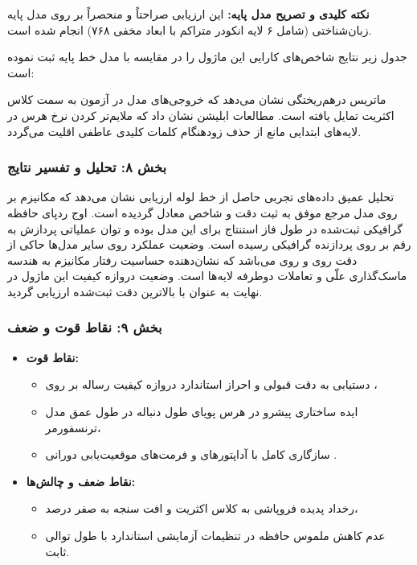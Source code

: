 \textbf{نکته کلیدی و تصریح مدل پایه:} این ارزیابی صراحتاً و منحصراً بر روی مدل پایه زبان‌شناختی  (شامل ۶ لایه انکودر متراکم با ابعاد مخفی ۷۶۸) انجام شده است.

جدول زیر نتایج شاخص‌های کارایی این ماژول را در مقایسه با مدل خط پایه ثبت نموده است:

ماتریس درهم‌ریختگی نشان می‌دهد که خروجی‌های مدل در آزمون به سمت کلاس اکثریت تمایل یافته است. مطالعات ابلیشن نشان داد که ملایم‌تر کردن نرخ هرس در لایه‌های ابتدایی مانع از حذف زودهنگام کلمات کلیدی عاطفی اقلیت می‌گردد.
\subsubsection*{بخش ۸: تحلیل و تفسیر نتایج }
تحلیل عمیق داده‌های تجربی حاصل از خط لوله ارزیابی نشان می‌دهد که مکانیزم  بر روی مدل مرجع  موفق به ثبت دقت  و شاخص  معادل  گردیده است. اوج ردپای حافظه گرافیکی ثبت‌شده در طول فاز استنتاج برای این مدل  بوده و توان عملیاتی پردازش به رقم  بر روی پردازنده گرافیکی  رسیده است. وضعیت عملکرد روی سایر مدل‌ها حاکی از دقت  روی  و  روی  می‌باشد که نشان‌دهنده حساسیت رفتار مکانیزم به هندسه ماسک‌گذاری علّی و تعاملات دوطرفه لایه‌ها است. وضعیت دروازه کیفیت این ماژول در نهایت به عنوان  با بالاترین دقت ثبت‌شده  ارزیابی گردید.

\subsubsection*{بخش ۹: نقاط قوت و ضعف }
\begin{itemize}
    \item \textbf{نقاط قوت:}
    \begin{itemize}
        \item دستیابی به دقت قبولی  و احراز استاندارد دروازه کیفیت رساله بر روی ،
        \item ایده ساختاری پیشرو در هرس پویای طول دنباله در طول عمق مدل ترنسفورمر،
        \item سازگاری کامل با آداپتورهای  و فرمت‌های موقعیت‌یابی دورانی .
    \end{itemize}
    \item \textbf{نقاط ضعف و چالش‌ها:}
    \begin{itemize}
        \item رخداد پدیده فروپاشی به کلاس اکثریت و افت سنجه  به صفر درصد،
        \item عدم کاهش ملموس حافظه در تنظیمات آزمایشی استاندارد با طول توالی ثابت.
    \end{itemize}
\end{itemize}

